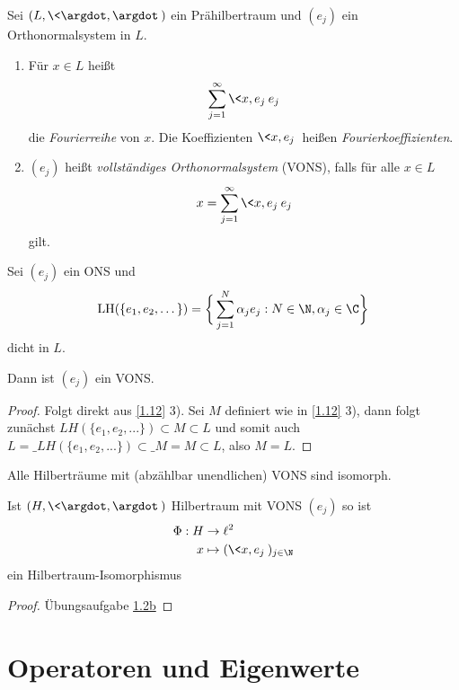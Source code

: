 \begin{df} \label{1.14}
	Sei $(L, \<\argdot,\argdot\>)$ ein Prähilbertraum und $(e_j)$ ein Orthonormalsystem in $L$.
	\begin{enumerate}[1)]
		\item
			Für $x\in L$ heißt
			\[
				\sum_{j=1}^\infty \<x,e_j\> e_j
			\]
			die \emph{Fourierreihe} von $x$.
			Die Koeffizienten $\<x,e_j\>$ heißen \emph{Fourierkoeffizienten}.
		\item
			$(e_j)$ heißt \emph{vollständiges Orthonormalsystem} (VONS), falls für alle $ x\in L $
			\[
				x = \sum_{j=1}^\infty \<x,e_j\> e_j
			\]
			gilt.
	\end{enumerate}
\end{df}

\begin{nt} \label{1.15}
	Sei $(e_j)$ ein ONS und
	\[
		\LH(\{e_1,e_2,\dotsc\}) = \bigg\{ \sum_{j=1}^N \alpha_j e_j : N \in \N, \alpha_j \in \C \bigg\}
	\]
	dicht in $L$.

	Dann ist $(e_j)$ ein VONS.
	\begin{proof}
		Folgt direkt aus \ref{1.12} 3). Sei $ M $ definiert wie in \ref{1.12} 3), dann folgt zunächst $ LH(\{e_1,e_2,...\})\subset M \subset L $ und somit auch $ L=\_{LH(\{e_1,e_2,...\})}\subset \_ M=M\subset L $, also $ M=L $.
	\end{proof}
\end{nt}

\begin{st} \label{1.16}
	Alle Hilberträume mit (abzählbar unendlichen) VONS sind isomorph. 

	Ist $(H,\<\argdot, \argdot\>)$ Hilbertraum mit VONS $(e_j)$ so ist
	\begin{align*}
		\Phi: H &\to \ell^2 \\
		x &\mapsto (\<x,e_j\>)_{j\in \N}
	\end{align*}
	ein Hilbertraum-Isomorphismus
	\begin{proof}
		Übungsaufgabe \href{http://www.iadm.uni-stuttgart.de/LstAnaMPhy/Lesky/Vorlesungen/13-Hoehere-Analysis/blatt01.pdf}{1.2b}
	\end{proof}
\end{st}



\section{Operatoren und Eigenwerte}



